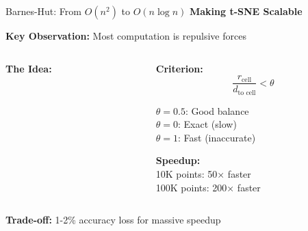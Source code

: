 \documentclass[10pt]{beamer}
\newcommand{\emphtext}[1]{\textcolor{upcblue}{\textbf{#1}}}
\newcommand{\warningbox}[1]{\colorbox{red!10}{\begin{minipage}{0.85\textwidth}\centering #1\end{minipage}}}
\begin{document}
\begin{frame}{Barnes-Hut: From $O(n^2)$ to $O(n\log n)$}
\emphtext{Making t-SNE Scalable}

\vspace{0.3cm}
\textbf{Key Observation:} Most computation is repulsive forces

\begin{columns}[T]
\begin{column}{0.48\textwidth}
\textbf{The Idea:}
\end{column}

\begin{column}{0.48\textwidth}
\textbf{Criterion:}
$$\frac{r_{\text{cell}}}{d_{\text{to cell}}} < \theta$$

\footnotesize
$\theta = 0.5$: Good balance\\
$\theta = 0$: Exact (slow)\\
$\theta = 1$: Fast (inaccurate)

\vspace{0.2cm}
\textbf{Speedup:}\\
10K points: 50× faster\\
100K points: 200× faster
\end{column}
\end{columns}

\vspace{0.3cm}
\begin{center}
\warningbox{\footnotesize\textbf{Trade-off:} 1-2\% accuracy loss for massive speedup}
\end{center}
\end{frame}
\end{document}
